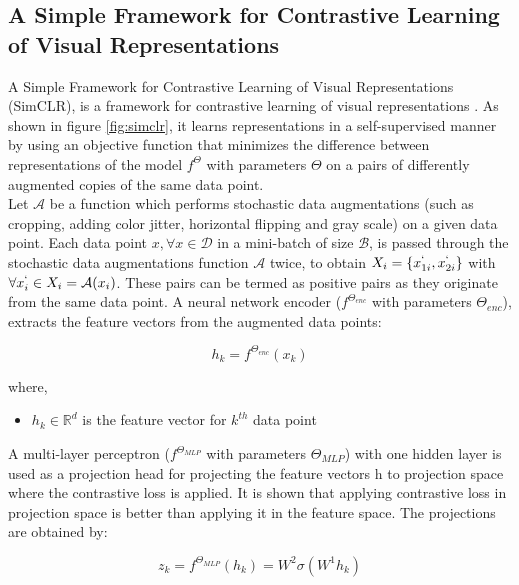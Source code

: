 \subsection{A Simple Framework for Contrastive Learning of Visual Representations}
A Simple Framework for Contrastive Learning of Visual Representations (SimCLR), is a framework for contrastive learning of visual representations \cite{chen2020}. As shown in figure \ref{fig:simclr}, it learns representations in a self-supervised manner by using an objective function that minimizes the difference between representations of the model $f^{\Theta}$ with parameters $\Theta$ on a pairs of differently augmented copies of the same data point. \\
Let $\mathcal{A}$ be a function which performs stochastic data augmentations (such as cropping, adding color jitter, horizontal flipping and gray scale) on a given data point. Each data point $x, \forall x \in \mathcal{D}$ in a mini-batch of size $\mathcal{B}$, is passed through the stochastic data augmentations function $\mathcal{A}$ twice, to obtain $X_i = \{x_{1i}^{`}, x_{2i}^{`}\}$ with $\forall x_i^{`} \in X_i = \mathcal{A}(x_i)$. These pairs can be termed as positive pairs as they originate from the same data point. A neural network encoder ($f^{\Theta_{enc}}$ with parameters $\Theta_{enc}$), extracts the feature vectors from the augmented data points:

\begin{equation}
    \label{equation:simclr_encoder}
    h_k = f^{\Theta_{enc}}(x_k)
\end{equation}

where,
\begin{itemize}[label={}]
  \setlength\itemsep{0em}
  \item $h_k \in \mathbb{R}^{d}$ is the feature vector for $k^{th}$ data point
\end{itemize}

A multi-layer perceptron ($f^{\Theta_{MLP}}$ with parameters $\Theta_{MLP}$) with one hidden layer is used as a projection head for projecting the feature vectors h to projection space where the contrastive loss is applied. It is shown\cite{chen2020} that applying contrastive loss in projection space is better than applying it in the feature space. The projections are obtained by:

\begin{equation}
    \label{equation:simclr_mlp}
    z_k = f^{\Theta_{MLP}}(h_k) = W^{2}\sigma(W^{1}h_k)
\end{equation}

